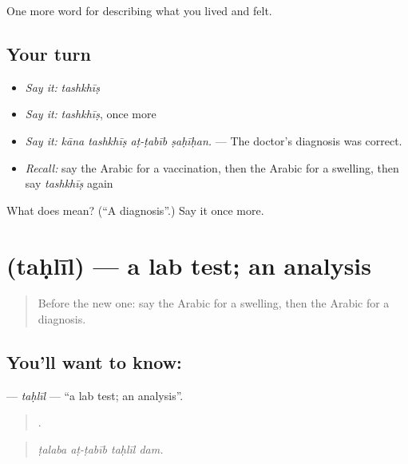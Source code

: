 \begin{grammarlens}[title={What you've built}]
One more word for describing what you lived and felt.
\end{grammarlens}

\subsection*{Your turn}
\begin{itemize}
\raggedright
  \item \emph{Say it:} \emph{tashkhīṣ}
  \item \emph{Say it:} \emph{tashkhīṣ}, once more
  \item \emph{Say it:} \emph{kāna tashkhīṣ aṭ-ṭabīb ṣaḥīḥan.} — The doctor's diagnosis was correct.
  \item \emph{Recall:} say the Arabic for a vaccination, then the Arabic for a swelling, then say \emph{tashkhīṣ} again
\end{itemize}

\begin{tcolorbox}[breakable,colback=teal!4,colframe=teal!35!black,title={Before you move on}]
What does  mean? (\textquotedblleft{}A diagnosis\textquotedblright{}.) Say it once more.
\end{tcolorbox}
\section[\texorpdfstring{\ar{تحليل} (taḥlīl)}{تحليل (taḥlīl)}]{ (taḥlīl) — a lab test; an analysis}

\label{lesson:AR-C510-tahlil}



\begin{quote}
Before the new one: say the Arabic for a swelling, then the Arabic for a diagnosis.
\end{quote}

\subsection*{You'll want to know: }
\textbf{} — \emph{taḥlīl} — \textquotedblleft{}a lab test; an analysis\textquotedblright{}.

\begin{quote}
   .
\end{quote}

\begin{quote}
\emph{ṭalaba aṭ-ṭabīb taḥlīl dam.}
\end{quote}

